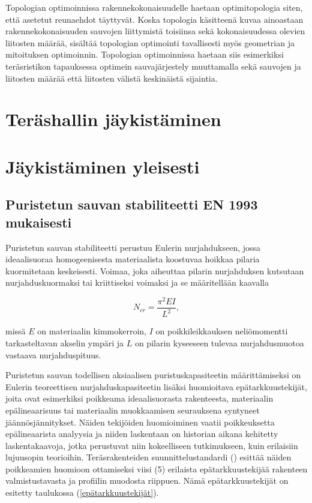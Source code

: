 \documentclass[12pt]{article}
\newenvironment{content}{\pagenumbering{arabic}}{}
\begin{document}
\begin{content}
Topologian optimoinnissa rakennekokonaisuudelle haetaan optimitopologia siten, että asetetut reunaehdot täyttyvät. Koska topologia käsitteenä kuvaa ainoastaan rakennekokonaisuuden sauvojen liittymistä toisiinsa sekä kokonaisuudessa olevien liitosten määrää, sisältää topologian optimointi tavallisesti myös geometrian ja mitoituksen optimoinnin. Topologian optimoinnissa haetaan siis esimerkiksi teräsristikon tapauksessa optimein sauvajärjestely muuttamalla sekä sauvojen ja liitosten määrää että liitosten välistä keskinäistä sijaintia. 






\section{Teräshallin jäykistäminen}

\section{Jäykistäminen yleisesti}



\subsection{Puristetun sauvan stabiliteetti EN 1993 mukaisesti}
Puristetun sauvan stabiliteetti perustuu Eulerin nurjahdukseen, jossa ideaalisuoraa homogeenisesta materiaalista koostuvaa hoikkaa pilaria kuormitetaan keskeisesti. Voimaa, joka aiheuttaa pilarin nurjahduksen kutsutaan nurjahduskuormaksi tai kriittiseksi voimaksi ja se määritellään kaavalla

\begin{equation}
\label{euler}
N_{cr} = \frac{\pi^2 E I}{L^2},
\end{equation}

missä $E$ on materiaalin kimmokerroin, $I$ on poikkileikkauksen neliömomentti tarkasteltavan akselin ympäri ja $L$ on pilarin kyseeseen tulevaa nurjahdusmuotoa vastaava nurjahduspituus. 

Puristetun sauvan todellisen aksiaalisen puristuskapasiteetin määrittämiseksi on Eulerin teoreettisen nurjahduskapasiteetin lisäksi huomioitava epätarkkuustekijät, joita ovat esimerkiksi poikkeama ideaalisuorasta rakenteesta, materiaalin epälineaarisuus tai materiaalin muokkaamisen seurauksena syntyneet jäännösjännitykset. Näiden tekijöiden huomioiminen vaatii poikkeuksetta epälineaarista analyysia ja niiden laskentaan on historian aikana kehitetty laskentakaavoja, jotka perustuvat niin kokeelliseen tutkimukseen, kuin erilaisiin lujuusopin teorioihin.\parencite[27]{ziemian} Teräsrakenteiden suunnittelustandardi (\citeauthor{en1993}) esittää näiden poikkeamien huomioon ottamiseksi viisi (5) erilaista epätarkkuustekijää rakenteen valmistustavasta ja profiilin muodosta riippuen. Nämä epätarkkuustekijät on esitetty taulukossa (\ref{epätarkkuustekijät}). 


\end{content}
\end{document}
